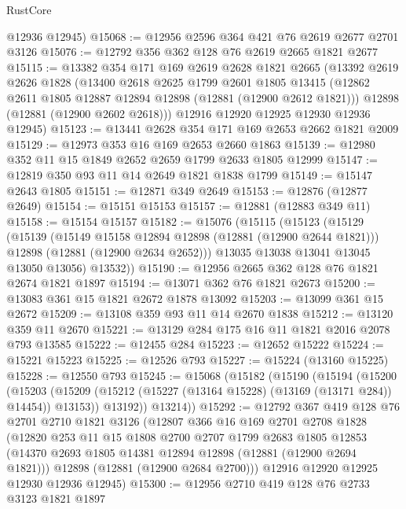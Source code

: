 \begin{lexlean}{RustCore}
\begin{coremodule}
      @12936
      @12945)
@15068 := @12956 @2596 @364 @421 @76 @2619 @2677 @2701 @3126
@15076 := @12792 @356 @362 @128 @76 @2619 @2665 @1821 @2677
@15115 := @13382
    @354
    @171
    @169
    @2619
    @2628
    @1821
    @2665
    (@13392
      @2619
      @2626
      @1828
      (@13400
        @2618
        @2625
        @1799
        @2601
        @1805
        @13415
        (@12862 @2611 @1805 @12887 @12894 @12898 (@12881 (@12900 @2612 @1821)))
        @12898
        (@12881 (@12900 @2602 @2618)))
      @12916
      @12920
      @12925
      @12930
      @12936
      @12945)
@15123 := @13441 @2628 @354 @171 @169 @2653 @2662 @1821 @2009
@15129 := @12973 @353 @16 @169 @2653 @2660 @1863
@15139 := @12980 @352 @11 @15 @1849 @2652 @2659 @1799 @2633 @1805 @12999
@15147 := @12819 @350 @93 @11 @14 @2649 @1821 @1838 @1799
@15149 := @15147 @2643 @1805
@15151 := @12871 @349 @2649
@15153 := @12876 (@12877 @2649)
@15154 := @15151 @15153
@15157 := @12881 (@12883 @349 @11)
@15158 := @15154 @15157
@15182 := @15076
    (@15115
      (@15123
        (@15129
          (@15139
            (@15149 @15158 @12894 @12898 (@12881 (@12900 @2644 @1821)))
            @12898
            (@12881 (@12900 @2634 @2652)))
          @13035
          @13038
          @13041
          @13045
          @13050
          @13056)
        @13532))
@15190 := @12956 @2665 @362 @128 @76 @1821 @2674 @1821 @1897
@15194 := @13071 @362 @76 @1821 @2673
@15200 := @13083 @361 @15 @1821 @2672 @1878 @13092
@15203 := @13099 @361 @15 @2672
@15209 := @13108 @359 @93 @11 @14 @2670 @1838
@15212 := @13120 @359 @11 @2670
@15221 := @13129 @284 @175 @16 @11 @1821 @2016 @2078 @793 @13585
@15222 := @12455 @284
@15223 := @12652 @15222
@15224 := @15221 @15223
@15225 := @12526 @793
@15227 := @15224 (@13160 @15225)
@15228 := @12550 @793
@15245 := @15068
    (@15182
      (@15190
        (@15194
          (@15200
            (@15203 (@15209 (@15212 (@15227 (@13164 @15228) (@13169 (@13171 @284)) @14454)) @13153))
            @13192))
        @13214))
@15292 := @12792
    @367
    @419
    @128
    @76
    @2701
    @2710
    @1821
    @3126
    (@12807
      @366
      @16
      @169
      @2701
      @2708
      @1828
      (@12820
        @253
        @11
        @15
        @1808
        @2700
        @2707
        @1799
        @2683
        @1805
        @12853
        (@14370 @2693 @1805 @14381 @12894 @12898 (@12881 (@12900 @2694 @1821)))
        @12898
        (@12881 (@12900 @2684 @2700)))
      @12916
      @12920
      @12925
      @12930
      @12936
      @12945)
@15300 := @12956 @2710 @419 @128 @76 @2733 @3123 @1821 @1897

\end{coremodule}
\end{lexlean}
